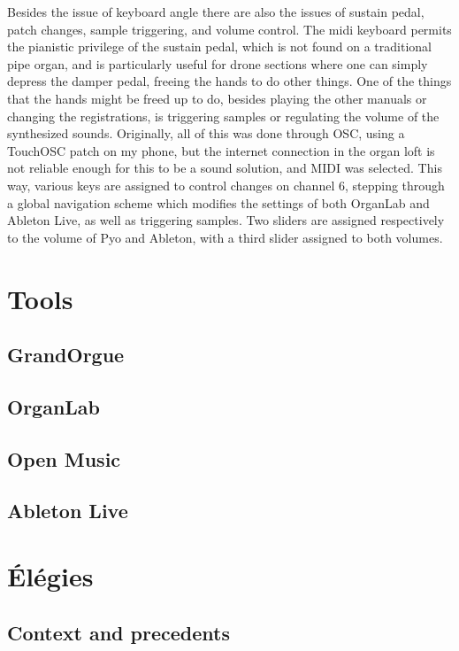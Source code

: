 \documentclass[12pt,twoside,maitrise]{dms}
\theoremstyle{definition}
\begin{document}
Besides the issue of keyboard angle there are also the issues of sustain pedal, patch changes, sample triggering, and volume control. The midi keyboard permits the pianistic privilege of the sustain pedal, which is not found on a traditional pipe organ, and is particularly useful for drone sections where one can simply depress the damper pedal, freeing the hands to do other things. One of the things that the hands might be freed up to do, besides playing the other manuals or changing the registrations, is triggering samples or regulating the volume of the synthesized sounds. Originally, all of this was done through OSC, using a TouchOSC patch on my phone, but the internet connection in the organ loft is not reliable enough for this to be a sound solution, and MIDI was selected. This way, various keys are assigned to control changes on channel 6, stepping through a global navigation scheme which modifies the settings of both OrganLab and Ableton Live, as well as triggering samples. Two sliders are assigned respectively to the volume of Pyo and Ableton, with a third slider assigned to both volumes. 

\section{Tools}

\subsection{GrandOrgue}

\subsection{OrganLab}

\subsection{Open Music}

\subsection{Ableton Live}

\section{Élégies}

\subsection{Context and precedents}
\end{document}
